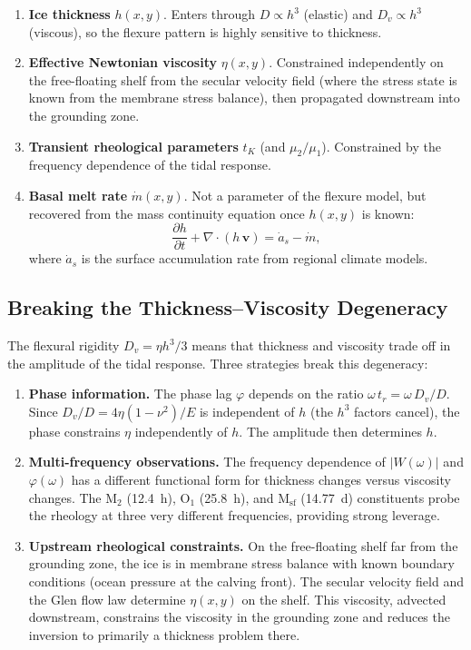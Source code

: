 \documentclass[11pt,letterpaper]{article}
\newcommand{\DDt}[1]{\frac{\partial #1}{\partial t}}
\begin{document}
\begin{enumerate}
  \item \textbf{Ice thickness} $h(x,y)$.  Enters through $D \propto h^3$ (elastic) and $D_v \propto h^3$ (viscous), so the flexure pattern is highly sensitive to thickness.
  \item \textbf{Effective Newtonian viscosity} $\eta(x,y)$.  Constrained independently on the free-floating shelf from the secular velocity field (where the stress state is known from the membrane stress balance), then propagated downstream into the grounding zone.
  \item \textbf{Transient rheological parameters} $t_K$ (and $\mu_2/\mu_1$).  Constrained by the frequency dependence of the tidal response.
  \item \textbf{Basal melt rate} $\dot{m}(x,y)$.  Not a parameter of the flexure model, but recovered from the mass continuity equation once $h(x,y)$ is known:
  \begin{equation}
    \DDt{h} + \nabla \cdot (h\,\bm{v}) = \dot{a}_s - \dot{m},
  \end{equation}
  where $\dot{a}_s$ is the surface accumulation rate from regional climate models.
\end{enumerate}

\subsection{Breaking the Thickness--Viscosity Degeneracy}
\label{sec:degeneracy}

The flexural rigidity $D_v = \eta h^3 / 3$ means that thickness and viscosity trade off in the amplitude of the tidal response.  Three strategies break this degeneracy:

\begin{enumerate}
  \item \textbf{Phase information.}  The phase lag $\varphi$ depends on the ratio $\omega\,t_r = \omega\,D_v/D$.  Since $D_v/D = 4\eta(1-\nu^2)/E$ is independent of $h$ (the $h^3$ factors cancel), the phase constrains $\eta$ independently of $h$.  The amplitude then determines $h$.

  \item \textbf{Multi-frequency observations.}  The frequency dependence of $|W(\omega)|$ and $\varphi(\omega)$ has a different functional form for thickness changes versus viscosity changes.  The M$_2$ (12.4~h), O$_1$ (25.8~h), and M$_{\text{sf}}$ (14.77~d) constituents probe the rheology at three very different frequencies, providing strong leverage.

  \item \textbf{Upstream rheological constraints.}  On the free-floating shelf far from the grounding zone, the ice is in membrane stress balance with known boundary conditions (ocean pressure at the calving front).  The secular velocity field and the Glen flow law determine $\eta(x,y)$ on the shelf.  This viscosity, advected downstream, constrains the viscosity in the grounding zone and reduces the inversion to primarily a thickness problem there.
\end{enumerate}
\end{document}
